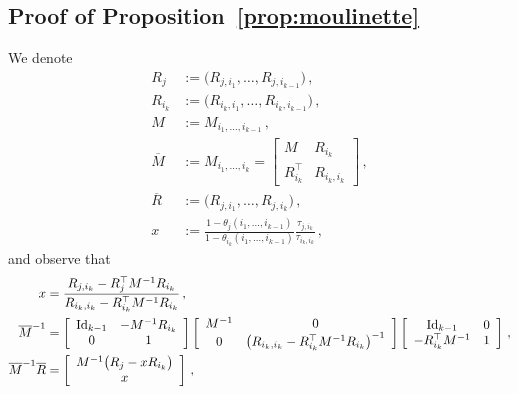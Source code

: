 \documentclass[final,numbib]{imaiai}%
\numberwithin{equation}{section}
\renewcommand{\bar}{\overline}
\def\\bUnif{\text{\bUnif}}
\newcommand{\<}{\langle}
\renewcommand{\>}{\rangle}
\newcommand{\1}{\mathds{1}}
\begin{document}
{\subsection{Proof of Proposition~\ref{prop:moulinette}}
\label{proof:moulinette}
We denote
\begin{align*}
R_{j}&:=\big(R_{j, i_1}, \ldots, R_{j,i_{k-1}}  \big)\,,\\
R_{i_k}&:=\big(R_{i_k, i_1} ,\ldots ,R_{ i_k, i_{k-1}} \big)\,,\\
M&:=M_{i_1,\ldots, i_{k-1}}\,,\\
\bar M&:=M_{i_1,\ldots, i_{k}}=\left[\begin{array}{cc}M & R_{i_k} \\R_{i_k}^\top & R_{i_k,i_k}\end{array}\right]\,,\\
\bar R&:=\big(R_{j, i_1}, \ldots, R_{j,i_{k}}  \big)\,,\\
x&:=\frac{1-\theta_j(i_1,\ldots, i_{k-1})}{1-\theta_{i_k}(i_1,\ldots, i_{k-1})}\frac{\tau_{j,i_k}}{\tau_{i_k,i_k}}\,,
\end{align*}
and observe that
\begin{align}
x&=\frac
{R_{j,i_k} -R_j^\top M^{-1}R_{i_k}}
{R_{i_k,i_k} -R_{i_k}^\top M^{-1}R_{i_k}}\,,\notag\\
{\bar M}^{-1}&=
\left[\begin{array}{cc}\mathrm{Id}_{k-1} & -M^{-1}R_{i_k} \\0 & 1\end{array}\right]
\left[\begin{array}{cc}M^{-1} & 0 \\0 & \big(R_{i_k,i_k} -R_{i_k}^\top M^{-1}R_{i_k}\big)^{-1}\end{array}\right]
\left[\begin{array}{cc}\mathrm{Id}_{k-1} & 0 \\-R_{i_k}^{\top}M^{-1} & 1\end{array}\right]\,,\notag\\
{\bar M}^{-1}\bar R&=
\left[\begin{array}{c}M^{-1}\big(R_j-xR_{i_k}\big) \\ x\end{array}\right]\,,%

\end{align}}
\end{document}
